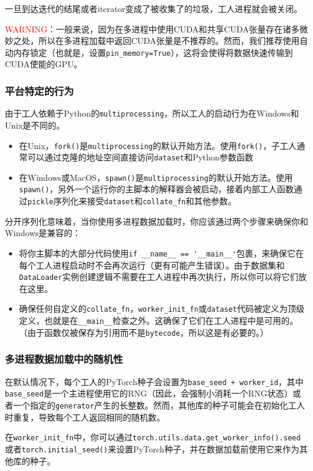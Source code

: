\documentclass[../main.tex]{subfile}
\begin{document}
一旦到达迭代的结尾或者iterator变成了被收集了的垃圾，工人进程就会被关闭。

\textcolor{red}{WARNING}：一般来说，因为在多进程中使用CUDA和共享CUDA张量存在诸多微妙之处，所以在多进程加载中返回CUDA张量是不推荐的。然而，我们推荐使用自动内存锁定（也就是，设置\lstinline{pin_memory=True}），这将会使得将数据快速传输到CUDA使能的GPU。

\subsubsection{平台特定的行为}

由于工人依赖于Python的\lstinline{multiprocessing}，所以工人的启动行为在Windows和Unix是不同的。
\begin{itemize}
    \item 在Unix，\lstinline{fork()}是\lstinline{multiprocessing}的默认开始方法。使用\lstinline{fork()}，子工人通常可以通过克隆的地址空间直接访问\lstinline{dataset}和Python参数函数
    \item 在Windows或MacOS，\lstinline{spawn()}是\lstinline{multiprocessing}的默认开始方法。使用\lstinline{spawn()}，另外一个运行你的主脚本的解释器会被启动，接着内部工人函数通过\lstinline{pickle}序列化来接受\lstinline{dataset}和\lstinline{collate_fn}和其他参数。
\end{itemize}
分开序列化意味着，当你使用多进程数据加载时，你应该通过两个步骤来确保你和Windows是兼容的：
\begin{itemize}
    \item 将你主脚本的大部分代码使用\lstinline{if __name__ == '__main__'}包裹，来确保它在每个工人进程启动时不会再次运行（更有可能产生错误）。由于数据集和\lstinline{DataLoader}实例创建逻辑不需要在工人进程中再次执行，所以你可以将它们放在这里。
    \item 确保任何自定义的\lstinline{collate_fn}，\lstinline{worker_init_fn}或\lstinline{dataset}代码被定义为顶级定义，也就是在\lstinline{__main__}检查之外。这确保了它们在工人进程中是可用的。（由于函数仅被保存为引用而不是\lstinline{bytecode}，所以这是有必要的。）
\end{itemize}

\subsubsection{多进程数据加载中的随机性}

在默认情况下，每个工人的PyTorch种子会设置为\lstinline{base_seed + worker_id}，其中\lstinline{base_seed}是一个主进程使用它的RNG（因此，会强制小消耗一个RNG状态）或者一个指定的\lstinline{generator}产生的长整数。然而，其他库的种子可能会在初始化工人时重复，导致每个工人返回相同的随机数。

在\lstinline{worker_init_fn}中，你可以通过\lstinline{torch.utils.data.get_worker_info().seed}或者\lstinline{torch.initial_seed()}来设置PyTorch种子，并在数据加载前使用它来作为其他库的种子。
\end{document}
